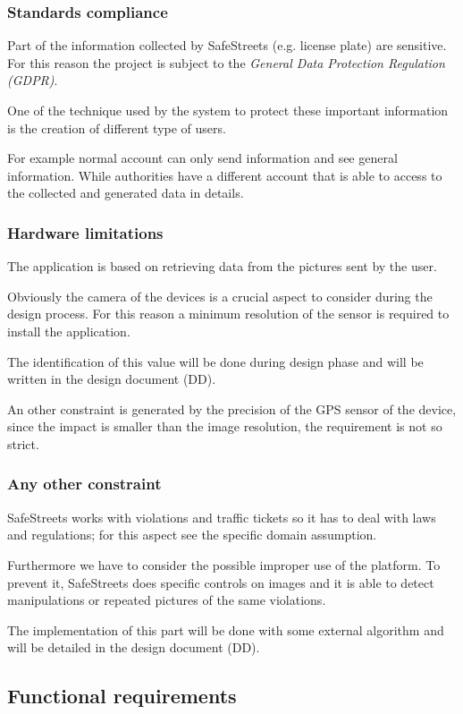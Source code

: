 \subsubsection{Standards compliance}
Part of the information collected by SafeStreets (e.g. license plate) are sensitive. For this reason the project is subject to the \textit{General Data Protection Regulation (GDPR)}. 

One of the technique used by the system to protect these important information is the creation of different type of users. 

For example normal account can only send information and see general information.
While authorities have a different account that is able to access to the collected and generated data in details.

\subsubsection{Hardware limitations}
The application is based on retrieving data from the pictures sent by the user. 

Obviously the camera of the devices is a crucial aspect to consider during the design process. For this reason a minimum resolution of the sensor is required to install the application.

The identification of this value will be done during design phase and will be written in the design document (DD).

An other constraint is generated by the precision of the GPS sensor of the device, since the impact is smaller than the image resolution, the requirement is not so strict. 

\subsubsection{Any other constraint}
SafeStreets works with violations and traffic tickets so it has to deal with laws and regulations; for this aspect see the specific domain assumption.

Furthermore we have to consider the possible improper use of the platform. To prevent it, SafeStreets does specific controls on images and it is able to detect manipulations or repeated pictures of the same violations. 

The implementation of this part will be done with some external algorithm and will be detailed in the design document (DD).

\subsection{Functional requirements}
